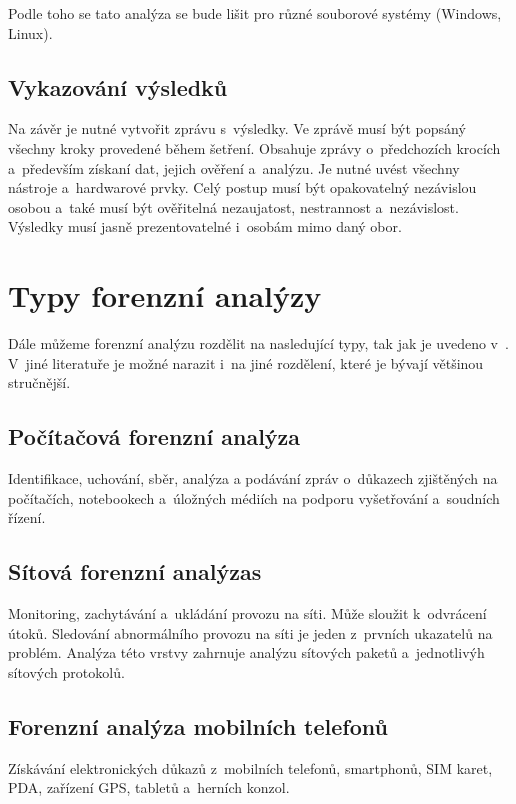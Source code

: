 \documentclass[thesis=B,czech]{FITthesis}[2012/06/26]
\begin{document}
\cite{for_root} Podle toho se tato analýza se bude lišit pro různé souborové systémy (Windows, Linux).

\subsection{Vykazování výsledků}
Na závěr je nutné vytvořit zprávu s~výsledky. Ve zprávě musí být popsáný všechny kroky provedené během šetření. Obsahuje zprávy o~předchozích krocích a~především získaní dat, jejich ověření a~analýzu. Je nutné uvést všechny nástroje a~hardwarové prvky. Celý postup musí být opakovatelný nezávislou osobou a~také musí být ověřitelná nezaujatost, nestrannost a~nezávislost. Výsledky musí jasně prezentovatelné i~osobám mimo daný obor.





\section{Typy forenzní analýzy}
Dále můžeme forenzní analýzu rozdělit na nasledující typy, tak jak je uvedeno v~\cite{for_types}. V~jiné literatuře je možné narazit i~na jiné rozdělení, které je bývají většinou stručnější.

\subsection{Počítačová forenzní analýza}
Identifikace, uchování, sběr, analýza a podávání zpráv o~důkazech zjištěných na počítačích, notebookech a~úložných médiích na podporu vyšetřování a~soudních řízení.

\subsection{Sítová forenzní analýzas}
Monitoring, zachytávání a~ukládání provozu na síti. Může sloužit k~odvrácení útoků. Sledování abnormálního provozu na síti je jeden z~prvních ukazatelů na problém. Analýza této vrstvy zahrnuje analýzu sítových paketů a~jednotlivýh sítových protokolů\cite{carrier2003defining}.

\subsection{Forenzní analýza  mobilních telefonů}
Získávání elektronických důkazů z~mobilních telefonů, smartphonů, SIM karet, PDA, zařízení GPS, tabletů a~herních konzol.
\end{document}

